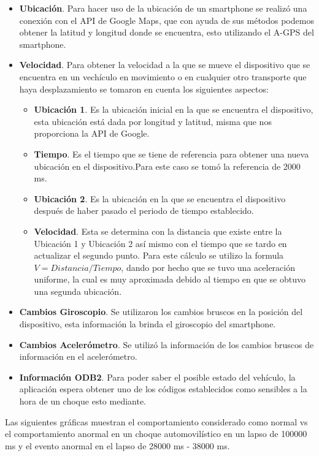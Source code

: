 \begin{itemize}
	\item \textbf{Ubicación}. Para hacer uso de la ubicación de un smartphone se realizó una conexión con el API de Google Maps, que con ayuda de sus métodos podemos obtener la latitud y longitud donde se encuentra, esto utilizando el A-GPS del smartphone.
	
	\item \textbf{Velocidad}. Para obtener la velocidad a la que se mueve el dispositivo que se encuentra en un vechículo en movimiento o en cualquier otro transporte que haya desplazamiento se tomaron en cuenta los siguientes aspectos:
	
	\begin{itemize}
		\item \textbf{Ubicación 1}. Es la ubicación inicial en la que se encuentra el dispositivo, esta ubicación está dada por longitud y latitud, misma que nos proporciona la API de Google.
		\item \textbf{Tiempo}. Es el tiempo que se tiene de referencia para obtener una nueva ubicación en el dispositivo.Para este caso se tomó la referencia de 2000 ms.
		\item \textbf{Ubicación 2}. Es la ubicación en la que se encuentra el dispositivo después de haber pasado el periodo de tiempo establecido.
		\item \textbf{Velocidad}. Esta se determina con la distancia que existe entre la Ubicación 1 y Ubicación 2 así mismo con el tiempo que se tardo en actualizar el segundo punto. Para este cálculo se utilizo la formula $V = Distancia/Tiempo$, dando por hecho que se tuvo una aceleración uniforme, la cual es muy aproximada debido al tiempo en que se obtuvo una segunda ubicación.
	\end{itemize}

	\item \textbf{Cambios Giroscopio}. Se utilizaron los cambios bruscos en la posición del dispositivo, esta información la brinda el giroscopio del smartphone. 
	\item \textbf{Cambios Acelerómetro}. Se utilizó la información de los cambios bruscos de información en el acelerómetro.
	\item \textbf{Información ODB2}. Para poder saber el posible estado del vehículo, la aplicación espera obtener uno de los códigos establecidos como sensibles a la hora de un choque esto mediante.
\end{itemize}

Las siguientes gráficas muestran el comportamiento considerado como normal vs el comportamiento anormal en un choque automovilístico en un lapso de 100000 ms y el evento anormal en el lapso de 28000 ms - 38000 ms.

